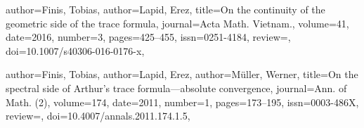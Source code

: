 \documentclass[11pt]{amsart}
\theoremstyle{remark}
\begin{document}
\begin{bibdiv}
\begin{biblist}
%   
%    
%    

   {
	   author={Finis, Tobias},
	   author={Lapid, Erez},
	   title={On the continuity of the geometric side of the trace formula},
	   journal={Acta Math. Vietnam.},
	   volume={41},
	   date={2016},
	   number={3},
	   pages={425--455},
	   issn={0251-4184},
	   review={},
	   doi={10.1007/s40306-016-0176-x},
	}

    {
       author={Finis, Tobias},
       author={Lapid, Erez},
       author={M{\"u}ller, Werner},
       title={On the spectral side of Arthur's trace formula---absolute
       convergence},
       journal={Ann. of Math. (2)},
       volume={174},
       date={2011},
       number={1},
       pages={173--195},
       issn={0003-486X},
       review={},
       doi={10.4007/annals.2011.174.1.5},
    }
    

\end{biblist}
\end{bibdiv}
\end{document}
